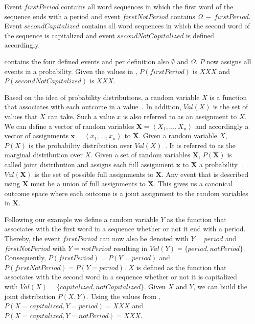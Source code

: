 Event $firstPeriod$ contains all word sequences in which the first word of the sequence ends with a period and event $firstNotPeriod$ contains $\Omega\ -\ firstPeriod$.
Event $secondCapitalized$ contains all word sequences in which the second word of the sequence is capitalized and event $secondNotCapitalized$ is defined accordingly.

 contains the four defined events and per definition also $\emptyset$ and $\Omega$.
$P$ now assigns all events in  a probability.
Given the values in , $P(firstPeriod)$ is $XXX$ and $P(secondNotCapitalized)$ is $XXX$.

\bigskip

Based on the idea of \glspl{probability distribution}, a \gls{random variable} $X$ is a \gls{function} that associates with each outcome in  a value~\cite{koller2009probabilistic}.
In addition, $Val(X)$ is the set of values that $X$ can take.
Such a value $x$ is also referred to as an assignment to $X$.
We can define a vector of \glspl{random variable} $\mathbf{X}=\left\langle X_1,\dots,X_n\right\rangle$ and accordingly a vector of assignments $\mathbf{x}=\left\langle x_1,\dots,x_n\right\rangle$ to $\mathbf{X}$.
Given a \gls{random variable} $X$, $P(X)$ is the \gls{probability distribution} over $Val(X)$~\cite{koller2009probabilistic}.
It is referred to as the \gls{marginal distribution} over $X$.
Given a set of \glspl{random variable} $\mathbf{X}$, $P(\mathbf{X})$ is called \gls{joint distribution} and assigns each \gls{full assignment} $\mathbf{x}$ to $\mathbf{X}$ a probability~\cite{koller2009probabilistic}.
$Val(\bm{X})$ is the set of possible \glspl{full assignment} to $\mathbf{X}$.
Any \gls{event} that is described using $\mathbf{X}$ must be a union of \glspl{full assignment} to $\mathbf{X}$.
This gives us a \gls{canonical outcome space} where each outcome is a joint assignment to the \glspl{random variable} in $\mathbf{X}$.

Following our example we define a \gls{random variable} $Y$ as the \gls{function} that associates with the first word in a sequence whether or not it end with a period.
Thereby, the \gls{event} $firstPeriod$ can now also be denoted with $Y = period$ and $firstNotPeriod$ with $Y = notPeriod$ resulting in $Val(Y)=\{period, notPeriod\}$.
Consequently, $P(firstPeriod)=P(Y=period)$ and $P(firstNotPeriod)=P(Y=period)$.
$X$ is defined as the function that associates with the second word in a sequence whether or not it is capitalized with $Val(X)=\{capitalized, notCapitalized\}$.
Given $X$ and $Y$, we can build the \gls{joint distribution} $P(X,Y)$.
Using the values from , $P(X=capitalized,Y=period)=XXX$ and $P(X=capitalized,Y=notPeriod)=XXX$.

